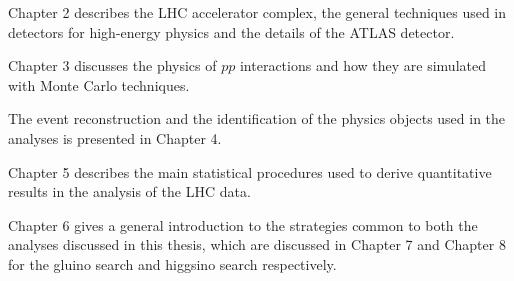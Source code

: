 \documentclass[11pt,a4paper]{article}
\begin{document}
Chapter 2 describes the LHC accelerator complex, the general techniques used in detectors 
for high-energy physics and the details of the ATLAS detector. 

Chapter 3 discusses the physics of $pp$ interactions and how they are simulated with Monte Carlo techniques. 

The event reconstruction and the identification of the physics objects used in the analyses is presented in Chapter 4. 

Chapter 5 describes the main statistical procedures used to derive quantitative results in the analysis of the LHC data.

Chapter 6 gives a general introduction to the strategies common to both the analyses discussed in this thesis, 
which are discussed in Chapter 7 and Chapter 8 for the gluino search and 
higgsino search respectively. 
\end{document}
